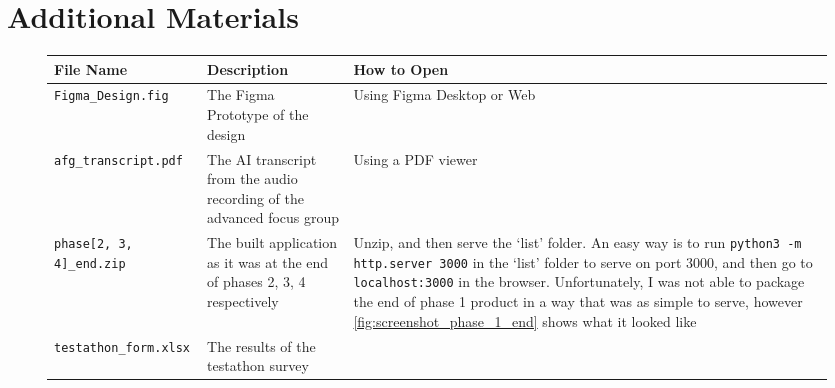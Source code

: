 \chapter{Additional Materials}
\label{appx:additional_mats}
\begin{figure}[h]
    \centering
    \begin{tabular}{|m{4cm}|p{5cm}|>{\raggedright\arraybackslash}p{5.5cm}|}
        \hline \textbf{File Name} & \textbf{Description} & \textbf{How to Open} \\ \hline
        \verb|Figma_Design.fig| & The Figma Prototype of the design & Using Figma Desktop or Web\\ \hline
        \verb|afg_transcript.pdf| & The AI transcript from the audio recording of the advanced focus group & Using a PDF viewer\\ \hline

        \verb|phase[2, 3, 4]_end.zip| & The built application as it was at the end of phases 2, 3, 4 respectively & Unzip, and then serve the `list' folder. \newline An easy way is to run \verb|python3 -m http.server 3000| in the `list' folder to serve on port 3000, and then go to \verb|localhost:3000| in the browser. Unfortunately, I was not able to package the end of phase 1 product in a way that was as simple to serve, however \ref{fig:screenshot_phase_1_end} shows what it looked like\\ \hline

        \verb|testathon_form.xlsx| & The results of the testathon survey & \ \\ \hline
    \end{tabular}
\end{figure}
